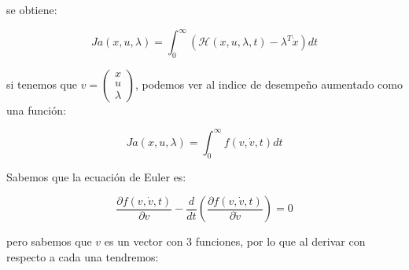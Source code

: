    se obtiene:

    \begin{equation}
        Ja(x, u, \lambda) = \int_0^{\infty} \left( \mathscr{H}(x, u, \lambda, t) - \lambda^T \dot{x} \right) dt
    \end{equation}

    si tenemos que $v =\begin{pmatrix} x \\ u \\ \lambda \end{pmatrix}$, podemos ver al indice de desempeño aumentado como una función:

    \begin{equation*}
        Ja(x, u, \lambda) = \int_0^{\infty} f(v, \dot{v}, t) dt
    \end{equation*}

    Sabemos que la ecuación de Euler es:

    \begin{equation}
        \frac{\partial f(v, \dot{v}, t)}{\partial v} - \frac{d}{dt} \left( \frac{\partial f(v, \dot{v}, t)}{\partial \dot{v}} \right) = 0
    \end{equation}

    pero sabemos que $v$ es un vector con 3 funciones, por lo que al derivar con respecto a cada una tendremos:

